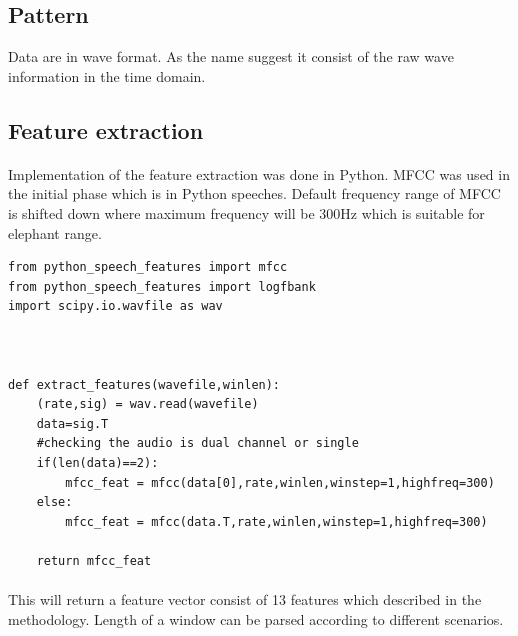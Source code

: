 \documentclass[12pt]{article}
\numberwithin{figure}{section}
\numberwithin{table}{section}
\begin{document}
\subsection{Pattern}
Data are in wave format. As the name suggest it consist of the raw wave information in the time domain. 
\subsection{Feature extraction}
\paragraph{}
Implementation of the feature extraction was done in Python. MFCC was used in the initial phase which is in Python speeches. Default frequency range of MFCC is shifted down where maximum frequency will be 300Hz which is suitable for elephant range.
\begin{lstlisting}
from python_speech_features import mfcc
from python_speech_features import logfbank
import scipy.io.wavfile as wav



def extract_features(wavefile,winlen):
    (rate,sig) = wav.read(wavefile)
    data=sig.T
    #checking the audio is dual channel or single
    if(len(data)==2):
        mfcc_feat = mfcc(data[0],rate,winlen,winstep=1,highfreq=300)
    else:
        mfcc_feat = mfcc(data.T,rate,winlen,winstep=1,highfreq=300)
        
    return mfcc_feat
\end{lstlisting}

\paragraph{}
This will return a feature vector consist of 13 features which described in the methodology. Length of a window can be parsed according to different scenarios.

\newpage
\end{document}
